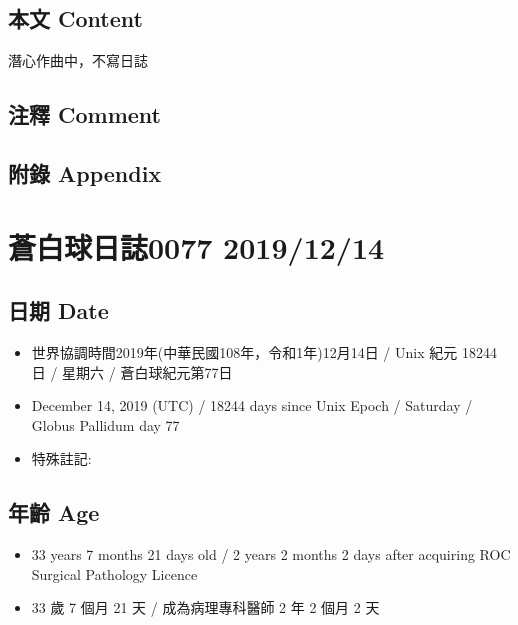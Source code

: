 \documentclass[a5paper, 12pt
]{book}
\providecommand{\tightlist}{%
  \setlength{\itemsep}{0pt}\setlength{\parskip}{0pt}}
\begin{document}
\hypertarget{ux672cux6587-content-12}{%
\subsection{本文 Content}\label{ux672cux6587-content-12}}

潛心作曲中，不寫日誌

\hypertarget{ux6ce8ux91cb-comment-11}{%
\subsection{注釋 Comment}\label{ux6ce8ux91cb-comment-11}}

\hypertarget{ux9644ux9304-appendix-12}{%
\subsection{附錄 Appendix}\label{ux9644ux9304-appendix-12}}

\hypertarget{ux84bcux767dux7403ux65e5ux8a8c0077-20191214}{%
\section{蒼白球日誌0077
2019/12/14}\label{ux84bcux767dux7403ux65e5ux8a8c0077-20191214}}

\hypertarget{ux65e5ux671f-date-13}{%
\subsection{日期 Date}\label{ux65e5ux671f-date-13}}

\begin{itemize}
\tightlist
\item
  世界協調時間2019年(中華民國108年，令和1年)12月14日 / Unix 紀元 18244
  日 / 星期六 / 蒼白球紀元第77日
\item
  December 14, 2019 (UTC) / 18244 days since Unix Epoch / Saturday /
  Globus Pallidum day 77
\item
  特殊註記:
\end{itemize}

\hypertarget{ux5e74ux9f61-age-13}{%
\subsection{年齡 Age}\label{ux5e74ux9f61-age-13}}

\begin{itemize}
\tightlist
\item
  33 years 7 months 21 days old / 2 years 2 months 2 days after
  acquiring ROC Surgical Pathology Licence
\item
  33 歲 7 個月 21 天 / 成為病理專科醫師 2 年 2 個月 2 天
\end{itemize}
\end{document}
